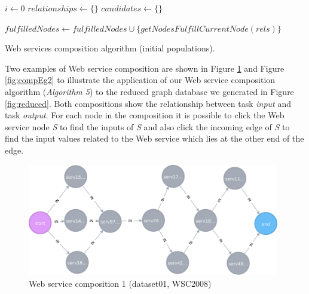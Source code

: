 \begin{algorithm}[H]
 \LinesNumbered
 \SetNlSty{}{}{:}
   $i \leftarrow 0$\;
   $relationships \leftarrow \{\}$\;
   $candidates \leftarrow \{\}$\; 

   $fulfilledNodes \leftarrow fulfilledNodes \cup \{getNodesFulfillCurrentNode(rels)\}$\;
 \caption{\footnotesize Web services composition algorithm (initial populations).}
\label{generation}
\end{algorithm}
\setlength{\textfloatsep}{20pt}%

Two examples of Web service composition are shown in Figure \ref{fig:compEg1} and Figure \ref{fig:compEg2} to illustrate the application of our Web service composition algorithm (\emph{Algorithm 5}) to the reduced graph database we generated in Figure \ref{fig:reduced}. Both compositions show the relationship between task \emph{input} and task \emph{output}. For each node in the composition it is possible to click the Web service node \emph{S} to find the inputs of \emph{S} and also click the incoming edge of \emph{S} to find the input values related to the Web service which lies at the other end of the edge. \par
\begin{figure}[h]
\includegraphics[width=11cm]{svg-composition1.pdf}
\centering
\caption{Web service composition 1 (dataset01, WSC2008)}
\label{fig:compEg1} 
\end{figure} 

